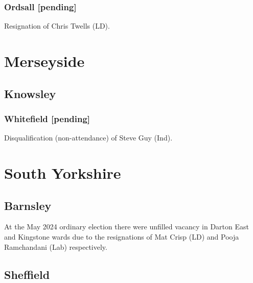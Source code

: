 \documentclass[a4paper,openany]{book}
\begin{document}
\begin{resultsiii}
\subsubsection*{Ordsall \hspace*{\fill}\nolinebreak[1]%
	\enspace\hspace*{\fill}
	[pending]}


Resignation of Chris Twells (LD).

\section{Merseyside}

\subsection*{Knowsley}

\subsubsection*{Whitefield \hspace*{\fill}\nolinebreak[1]%
	\enspace\hspace*{\fill}
	[pending]}


Disqualification (non-attendance) of Steve Guy (Ind).

\section{South Yorkshire}

\subsection*{Barnsley}

At the May 2024 ordinary election there were unfilled vacancy in Darton East and Kingstone wards due to the resignations of Mat Crisp (LD) and Pooja Ramchandani (Lab) respectively.%

\subsection*{Sheffield}


\end{resultsiii}
\end{document}
